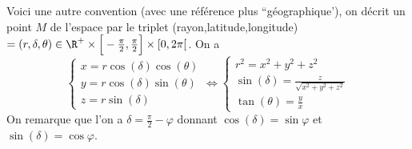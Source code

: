 Voici une autre convention (avec une référence plus ``géographique'), on décrit un point $M$ de l'espace par le triplet (rayon,latitude,longitude)$=(r,\delta,\theta) \in \R^+ \times \Big[-\frac{\pi}{2}, \frac{\pi}{2} \Big] \times [0,2\pi[$. On a 
\sld{\vfill\pagebreak[5]}%
\[
	\begin{cases}
		x = r\cos(\delta) \cos(\theta)\\
		y = r \cos(\delta) \sin(\theta) \\
	        z = r \sin(\delta)
	\end{cases}
\Leftrightarrow
\begin{cases}
	r^2 = x^2+y^2+z^2 \\
	\sin(\delta) = \frac{z}{\sqrt{x^2+y^2+z^2} } \\
	\tan(\theta) = \frac y x
\end{cases}
\]
On remarque que l'on a $\delta = \frac\pi2 - \varphi$ donnant $\cos(\delta) = \sin{\varphi}$ et $\sin(\delta) = \cos{\varphi}$.
